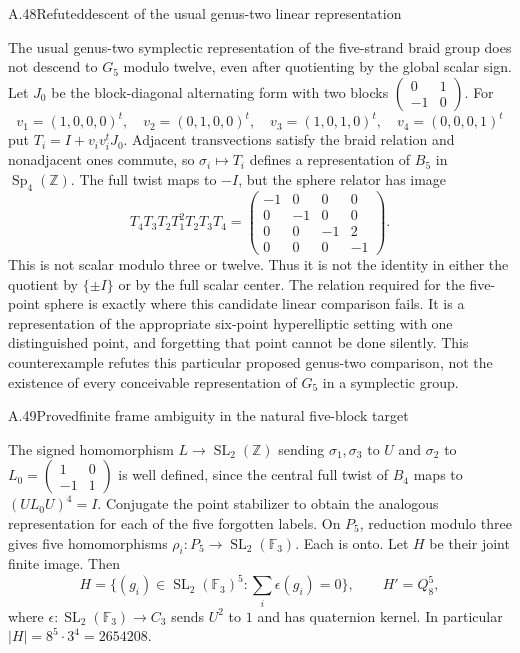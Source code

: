 \begin{statement}{A.48}{Refuted}{descent of the usual genus-two linear representation}
\end{statement}
The usual genus-two symplectic representation of the five-strand braid
group does not descend to $G_5$ modulo twelve, even after quotienting by
the global scalar sign. Let $J_0$ be the block-diagonal alternating form
with two blocks $\left(\begin{smallmatrix}0&1\\-1&0\end{smallmatrix}\right)$.
For
\[
 v_1=(1,0,0,0)^t,\quad v_2=(0,1,0,0)^t,\quad
 v_3=(1,0,1,0)^t,\quad v_4=(0,0,0,1)^t
\]
put $T_i=I+v_i v_i^tJ_0$. Adjacent transvections satisfy the braid
relation and nonadjacent ones commute, so $\sigma_i\mapsto T_i$
defines a representation of $B_5$ in $\operatorname{Sp}_4(\mathbb Z)$.
The full twist maps to $-I$, but the sphere relator has image
\[
 T_4T_3T_2T_1^2T_2T_3T_4
 =\begin{pmatrix}
 -1&0&0&0\\0&-1&0&0\\0&0&-1&2\\0&0&0&-1
 \end{pmatrix}.
\]
This is not scalar modulo three or twelve. Thus it is not the identity
in either the quotient by $\{\pm I\}$ or by the full scalar center.
The relation required for the five-point sphere is exactly where this
candidate linear comparison fails. It is a representation of the
appropriate six-point hyperelliptic setting with one distinguished point,
and forgetting that point cannot be done silently. This counterexample
refutes this particular proposed genus-two comparison, not the existence
of every conceivable representation of $G_5$ in a symplectic group.

\begin{statement}{A.49}{Proved}{finite frame ambiguity in the natural five-block target}
\end{statement}
The signed homomorphism $L\to\operatorname{SL}_2(\mathbb Z)$ sending
$\sigma_1,\sigma_3$ to $U$ and $\sigma_2$ to $L_0=
\left(\begin{smallmatrix}1&0\\-1&1\end{smallmatrix}\right)$ is well defined,
since the central full twist of $B_4$ maps to $(UL_0U)^4=I$.
Conjugate the point stabilizer to obtain the analogous representation for
each of the five forgotten labels. On $P_5$, reduction modulo three gives
five homomorphisms $\rho_i:P_5\to\operatorname{SL}_2(\mathbb F_3)$.
Each is onto. Let $H$ be their joint finite image. Then
\[
 H=\{(g_i)\in\operatorname{SL}_2(\mathbb F_3)^5:
          \textstyle\sum_i\epsilon(g_i)=0\},\qquad
 H'=Q_8^5,
\]
where $\epsilon:\operatorname{SL}_2(\mathbb F_3)\to C_3$ sends
$U^2$ to $1$ and has quaternion kernel. In particular
$|H|=8^5\cdot3^4=2654208$.

